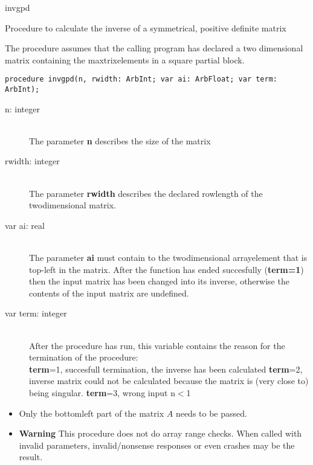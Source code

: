 \documentclass{report}
\newcommand{\FunctionDescription}{\item[Description]\rmfamily}
\newcommand{\Dataorganisation}{\item[Data Struct]\rmfamily}
\newcommand{\DeclarationandParams}{\item[Declaration]\rmfamily}
\newcommand{\Remarks}{\item[Remarks]\rmfamily}
\begin{document}
\begin{procedure}{invgpd}

\FunctionDescription

Procedure to calculate the inverse of a symmetrical, positive definite
matrix


\Dataorganisation
The procedure assumes that the calling program has declared a two dimensional
matrix containing the maxtrixelements in a square partial block.

\DeclarationandParams

\lstinline|procedure invgpd(n, rwidth: ArbInt; var ai: ArbFloat; var term: ArbInt);|

\begin{description}
 \item[n: integer] \mbox{ } \\
    The parameter {\bf n} describes the size of the matrix
 \item[rwidth: integer] \mbox{} \\
    The parameter {\bf rwidth} describes the declared rowlength of the twodimensional
    matrix.
 \item[var ai: real] \mbox{} \\
    The parameter {\bf ai} must contain to the twodimensional arrayelement
    that is top-left in the matrix.
    After the function has ended succesfully (\textbf{term=1}) then 
    the input matrix has been changed into its inverse, otherwise the contents 
    of the input matrix are undefined.
 \item[var term: integer]  \mbox{} \\
    After the procedure has run, this variable contains the reason for 
    the termination of the procedure:\\
      {\bf term}=1, succesfull termination, the inverse has been calculated
      {\bf term}=2, inverse matrix could not be calculated because the matrix
		    is (very close to) being singular.
      {\bf term}=3, wrong input n$<$1
\end{description}
\Remarks

\begin{itemize}
\item Only the bottomleft part of the matrix $A$ needs to be passed.
\item \textbf{Warning} This procedure does not do array range checks. When called with invalid
parameters, invalid/nonsense responses or even crashes may be the result.
\end{itemize}


\end{procedure}
\end{document}
